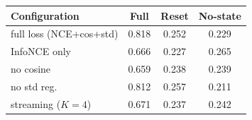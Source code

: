 \begin{tabular}{lccc}
\toprule
Configuration & Full & Reset & No-state\\
\midrule
\rowcolor{MemCream}full loss (NCE+cos+std) & 0.818 & 0.252 & 0.229\\
InfoNCE only & 0.666 & 0.227 & 0.265\\
no cosine & 0.659 & 0.238 & 0.239\\
no std reg. & 0.812 & 0.257 & 0.211\\
streaming ($K{=}4$) & 0.671 & 0.237 & 0.242\\
\bottomrule
\end{tabular}
